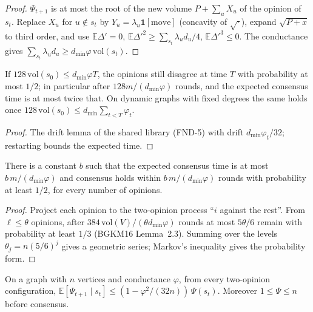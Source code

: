 \begin{proof}\leanok
$\Psi_{t+1}$ is at most the root of the new volume $P+\sum_u X_u$ of the opinion of $s_t$.
Replace $X_u$ for $u\notin s_t$ by $Y_u=\lambda_u\mathbf{1}[\text{move}]$ (concavity of
$\sqrt{\cdot}$), expand $\sqrt{P+x}$ to third order, and use $\mathbb{E}\Delta'=0$,
$\mathbb{E}\Delta'^2\ge\sum_{s_t}\lambda_ud_u/4$, $\mathbb{E}\Delta'^3\le0$. The conductance gives
$\sum_{s_t}\lambda_ud_u\ge d_{\min}\varphi\,\mathrm{vol}(s_t)$.
\end{proof}
\begin{theorem}\label{thm:bgkm-two}
\leanok{}
If $128\,\mathrm{vol}(s_0)\le d_{\min}\varphi T$, the opinions still disagree at time $T$ with
probability at most $1/2$; in particular after $128m/(d_{\min}\varphi)$ rounds, and the expected
consensus time is at most twice that. On dynamic graphs with fixed degrees the same holds once
$128\,\mathrm{vol}(s_0)\le d_{\min}\sum_{t<T}\varphi_t$.
\end{theorem}
\begin{proof}\leanok
The drift lemma of the shared library (FND-5) with drift $d_{\min}\varphi_t/32$; restarting
bounds the expected time.
\end{proof}
\begin{theorem}\label{thm:bgkm-many}
\leanok{}
There is a constant $b$ such that the expected consensus time is at most $b\,m/(d_{\min}\varphi)$
and consensus holds within $b\,m/(d_{\min}\varphi)$ rounds with probability at least $1/2$, for
every number of opinions.
\end{theorem}
\begin{proof}\leanok
Project each opinion to the two-opinion process ``$i$ against the rest''. From $\ell\le\theta$
opinions, after $384\,\mathrm{vol}(V)/(\theta d_{\min}\varphi)$ rounds at most $5\theta/6$
remain with probability at least $1/3$ (BGKM16 Lemma~2.3). Summing over the levels
$\theta_j=n(5/6)^j$ gives a geometric series; Markov's inequality gives the probability form.
\end{proof}
\begin{lemma}\label{lem:bgkm-mul}
\leanok{}
On a graph with $n$ vertices and conductance $\varphi$, from every two-opinion configuration,
$\mathbb{E}[\Psi_{t+1}\mid s_t]\le(1-\varphi^2/(32n))\,\Psi(s_t)$. Moreover $1\le\Psi\le n$
before consensus.
\end{lemma}
